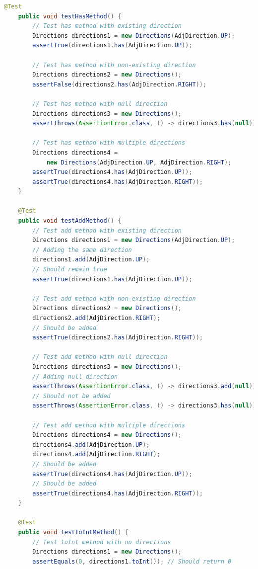 \documentclass[a4paper,11pt]{article}
\begin{document}
\begin{lstlisting}[language=Java]
    @Test
    public void testHasMethod() {
        // Test has method with existing direction
        Directions directions1 = new Directions(AdjDirection.UP);
        assertTrue(directions1.has(AdjDirection.UP));

        // Test has method with non-existing direction
        Directions directions2 = new Directions();
        assertFalse(directions2.has(AdjDirection.RIGHT));

        // Test has method with null direction
        Directions directions3 = new Directions();
        assertThrows(AssertionError.class, () -> directions3.has(null));

        // Test has method with multiple directions
        Directions directions4 = 
            new Directions(AdjDirection.UP, AdjDirection.RIGHT);
        assertTrue(directions4.has(AdjDirection.UP));
        assertTrue(directions4.has(AdjDirection.RIGHT));
    }

    @Test
    public void testAddMethod() {
        // Test add method with existing direction
        Directions directions1 = new Directions(AdjDirection.UP);
        // Adding the same direction
        directions1.add(AdjDirection.UP); 
        // Should remain true
        assertTrue(directions1.has(AdjDirection.UP)); 

        // Test add method with non-existing direction
        Directions directions2 = new Directions();
        directions2.add(AdjDirection.RIGHT);
        // Should be added
        assertTrue(directions2.has(AdjDirection.RIGHT)); 

        // Test add method with null direction
        Directions directions3 = new Directions();
        // Adding null direction
        assertThrows(AssertionError.class, () -> directions3.add(null)); 
        // Should not be added
        assertThrows(AssertionError.class, () -> directions3.has(null)); 

        // Test add method with multiple directions
        Directions directions4 = new Directions();
        directions4.add(AdjDirection.UP);
        directions4.add(AdjDirection.RIGHT);
        // Should be added
        assertTrue(directions4.has(AdjDirection.UP)); 
        // Should be added
        assertTrue(directions4.has(AdjDirection.RIGHT)); 
    }

    @Test
    public void testToIntMethod() {
        // Test toInt method with no directions
        Directions directions1 = new Directions();
        assertEquals(0, directions1.toInt()); // Should return 0


\end{lstlisting}
\end{document}
